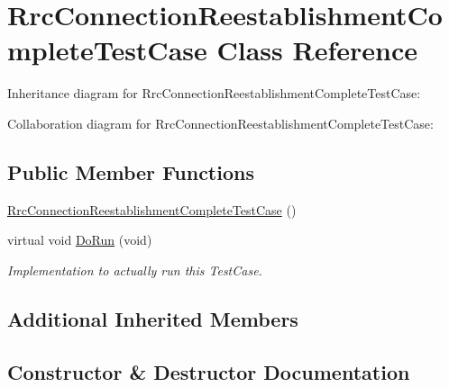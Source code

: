 \hypertarget{classRrcConnectionReestablishmentCompleteTestCase}{}\section{Rrc\+Connection\+Reestablishment\+Complete\+Test\+Case Class Reference}
\label{classRrcConnectionReestablishmentCompleteTestCase}


Inheritance diagram for Rrc\+Connection\+Reestablishment\+Complete\+Test\+Case\+:


Collaboration diagram for Rrc\+Connection\+Reestablishment\+Complete\+Test\+Case\+:
\subsection*{Public Member Functions}
\begin{DoxyCompactItemize}
\item 
\hyperlink{classRrcConnectionReestablishmentCompleteTestCase_a93abb3de0b09bee9756853d30d751cf4}{Rrc\+Connection\+Reestablishment\+Complete\+Test\+Case} ()
\item 
virtual void \hyperlink{classRrcConnectionReestablishmentCompleteTestCase_a7965b51e212680d083695536b2a2a9b0}{Do\+Run} (void)
\begin{DoxyCompactList}\small\item\em Implementation to actually run this Test\+Case. \end{DoxyCompactList}\end{DoxyCompactItemize}
\subsection*{Additional Inherited Members}


\subsection{Constructor \& Destructor Documentation}
